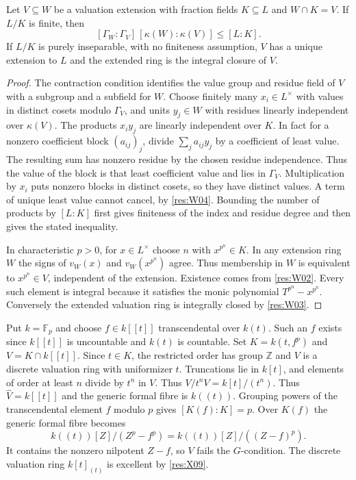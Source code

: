 \begin{theorem}\label{res:W08}
Let \(V\subseteq W\) be a valuation extension with fraction fields \(K\subseteq L\) and \(W\cap K=V\). If \(L/K\) is finite, then
\[
       [\Gamma_W:\Gamma_V]\,[\kappa(W):\kappa(V)]\le [L:K].
\]
If \(L/K\) is purely inseparable, with no finiteness assumption, \(V\) has a unique extension to \(L\) and the extended ring is the integral closure of \(V\).
\end{theorem}
\begin{proof}
The contraction condition identifies the value group and residue field of \(V\) with a subgroup and a subfield for \(W\). Choose finitely many \(x_i\in L^\times\) with values in distinct cosets modulo \(\Gamma_V\), and units \(y_j\in W\) with residues linearly independent over \(\kappa(V)\). The products \(x_i y_j\) are linearly independent over \(K\). In fact for a nonzero coefficient block \((a_{ij})_j\), divide \(\sum_j a_{ij}y_j\) by a coefficient of least value. The resulting sum has nonzero residue by the chosen residue independence. Thus the value of the block is that least coefficient value and lies in \(\Gamma_V\). Multiplication by \(x_i\) puts nonzero blocks in distinct cosets, so they have distinct values. A term of unique least value cannot cancel, by \ref{res:W04}. Bounding the number of products by \([L:K]\) first gives finiteness of the index and residue degree and then gives the stated inequality.

In characteristic \(p>0\), for \(x\in L^\times\) choose \(n\) with \(x^{p^n}\in K\). In any extension ring \(W\) the signs of \(v_W(x)\) and \(v_W(x^{p^n})\) agree. Thus membership in \(W\) is equivalent to \(x^{p^n}\in V\), independent of the extension. Existence comes from \ref{res:W02}. Every such element is integral because it satisfies the monic polynomial \(T^{p^n}-x^{p^n}\). Conversely the extended valuation ring is integrally closed by \ref{res:W03}.
\end{proof}

\begin{example}\label{res:W09}
Put \(k=\mathbb F_p\) and choose \(f\in k[[t]]\) transcendental over \(k(t)\).
Such an \(f\) exists since \(k[[t]]\) is uncountable and \(k(t)\) is countable.
Set \(K=k(t,f^p)\) and \(V=K\cap k[[t]]\). Since \(t\in K\), the restricted
order has group \(\mathbb Z\) and \(V\) is a discrete valuation ring with
uniformizer \(t\). Truncations lie in \(k[t]\), and elements of order
at least \(n\) divide by \(t^n\) in \(V\). Thus \(V/t^n V=k[t]/(t^n)\).
Thus \(\widehat V=k[[t]]\) and the generic formal fibre is \(k((t))\).
Grouping powers of the transcendental element \(f\) modulo \(p\) gives
\([K(f):K]=p\). Over \(K(f)\) the generic formal fibre becomes
\[
 k((t))[Z]/(Z^p-f^p)
        = k((t))[Z]/((Z-f)^p).
\]
It contains the nonzero nilpotent \(Z-f\), so \(V\) fails the \(G\)-condition.
The discrete valuation ring \(k[t]_{(t)}\) is excellent by \ref{res:X09}.
\end{example}
